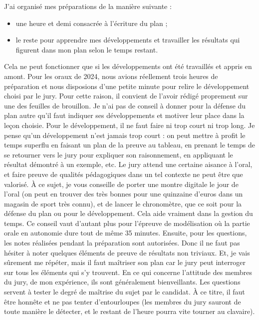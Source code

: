  J'ai organisé mes préparations de la manière suivante :
  \begin{itemize}
    \item une heure et demi consacrée à l'écriture du plan ;
    \item le reste pour apprendre mes développements et travailler les résultats qui figurent dans mon plan selon le temps restant.
  \end{itemize}
  Cela ne peut fonctionner que si les développements ont été travaillés et appris en amont. Pour les oraux de 2024, nous avions réellement trois heures de préparation et nous disposions d'une petite minute pour relire le développement choisi par le jury. Pour cette raison, il convient de l'avoir rédigé proprement sur une des feuilles de brouillon.
  \newpar
  Je n'ai pas de conseil à donner pour la défense du plan autre qu'il faut indiquer ses développements et motiver leur place dans la leçon choisie.
  \newpar
  Pour le développement, il ne faut faire ni trop court ni trop long. Je pense qu'un développement n'est jamais trop court : on peut mettre à profit le temps superflu en faisant un plan de la preuve au tableau, en prenant le temps de se retourner vers le jury pour expliquer son raisonnement, en appliquant le résultat démontré à un exemple, etc. Le jury attend une certaine aisance à l'oral, et faire preuve de qualités pédagogiques dans un tel contexte ne peut être que valorisé.
  \newpar
  À ce sujet, je vous conseille de porter une montre digitale le jour de l'oral (on peut en trouver des très bonnes pour une quinzaine d'euros dans un magasin de sport très connu), et de lancer le chronomètre, que ce soit pour la défense du plan ou pour le développement. Cela aide vraiment dans la gestion du temps. Ce conseil vaut d'autant plus pour l'épreuve de modélisation où la partie orale en autonomie dure tout de même 35 minutes.
  \newpar
  Ensuite, pour les questions, les notes réalisées pendant la préparation sont autorisées. Donc il ne faut pas hésiter à noter quelques éléments de preuve de résultats non triviaux. Et, je vais sûrement me répéter, mais il faut maîtriser son plan car le jury peut interroger sur tous les éléments qui s'y trouvent.
  \newpar
  En ce qui concerne l'attitude des membres du jury, de mon expérience, ils sont généralement bienveillants. Les questions servent à tester le degré de maîtrise du sujet par le candidat. À ce titre, il faut être honnête et ne pas tenter d'entourloupes (les membres du jury sauront de toute manière le détecter, et le restant de l'heure pourra vite tourner au clavaire).
